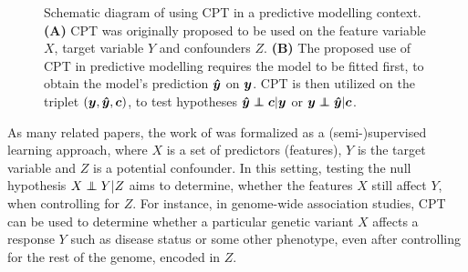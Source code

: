 \documentclass{article}
\begin{document}
\begin{figure}
{

    }
  \caption{Schematic diagram of using CPT in a predictive modelling context. \\ \textbf{(A)} CPT was originally proposed to be used on the feature variable $X$, target variable $Y$ and confounders $Z$. \textbf{(B)} The proposed use of CPT in predictive modelling requires the model to be fitted first, to obtain the model's prediction $\boldsymbol{\hat{y}}$ on $\boldsymbol{y}$. CPT is then utilized on the triplet $(\boldsymbol{y}, \boldsymbol{\hat{y}}, \boldsymbol{c})$, to test hypotheses $\yhat \independent \c | \y$ or $\y \independent \yhat | \c$.}
  \label{fig:schematic}
\end{figure}


As many related papers, the work of \cite{berrett2020conditional} was formalized as a (semi-)supervised learning approach, where $X$ is a set of predictors (features), $Y$ is the target variable and $Z$ is a potential confounder. In this setting, testing the null hypothesis $X \independent Y | Z$ aims to determine, whether the features $X$ still affect $Y$, when controlling for $Z$.
For instance, in genome-wide association studies, CPT can be used to determine whether a particular genetic variant $X$ affects a response $Y$ such as disease status or some other phenotype, even after controlling for the rest of the genome, encoded in $Z$.
\end{document}
